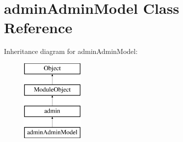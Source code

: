 \hypertarget{classadminAdminModel}{\section{admin\-Admin\-Model Class Reference}
\label{classadminAdminModel}
}
Inheritance diagram for admin\-Admin\-Model\-:\begin{figure}[H]
\begin{center}
\leavevmode
\includegraphics[height=4.000000cm]{classadminAdminModel}
\end{center}
\end{figure}
